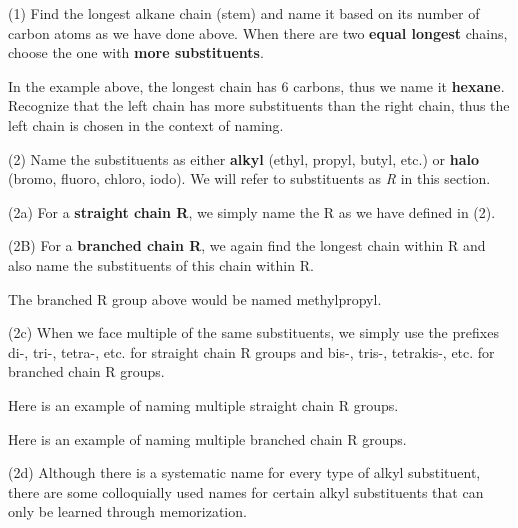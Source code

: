 \documentclass[10pt]{article}
\begin{document}
  (1) Find the longest alkane chain (stem) and name it based on its number of carbon atoms as we have done above. When there are two \textbf{equal longest} chains, choose the one with \textbf{more substituents}.


  In the example above, the longest chain has 6 carbons, thus we name it \textbf{hexane}. Recognize that the left chain has more substituents than the right chain, thus the left chain is chosen in the context of naming.

  (2) Name the substituents as either \textbf{alkyl} (ethyl, propyl, butyl, etc.) or \textbf{halo} (bromo, fluoro, chloro, iodo). We will refer to substituents as \textit{R} in this section.

  (2a) For a \textbf{straight chain R}, we simply name the R as we have defined in (2).


  (2B) For a \textbf{branched chain R}, we again find the longest chain within R and also name the substituents of this chain within R. 


  The branched R group above would be named methylpropyl.

  (2c) When we face multiple of the same substituents, we simply use the prefixes di-, tri-, tetra-, etc. for straight chain R groups and bis-, tris-, tetrakis-, etc. for branched chain R groups.

  Here is an example of naming multiple straight chain R groups.
  
  
  Here is an example of naming multiple branched chain R groups.


  (2d) Although there is a systematic name for every type of alkyl substituent, there are some colloquially used names for certain alkyl substituents that can only be learned through memorization.

\end{document}
